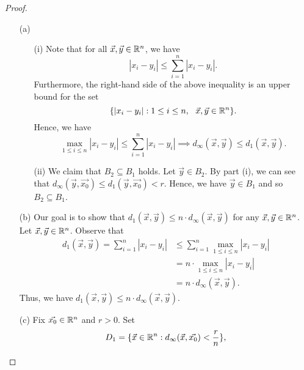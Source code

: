 \documentclass[a4paper]{article}
\begin{document}
\begin{proof}
\begin{enumerate}
    \item[(a)] 
        \begin{enumerate}
            \item[(i)] Note that for all \( \vec{ x } , \vec{ y } \in \mathbb{R}^{n} \), we have 
        \[  | {x}_{i} - {y}_{i} |  \leq \sum_{ i=1  }^{ n } | {x}_{i} - {y}_{i} |. \tag{\( \forall 1 \leq i \leq n \)}  \]
        Furthermore, the right-hand side of the above inequality is an upper bound for the set 
        \[  \{ | {x}_{i} - {y}_{i}  |  : 1 \leq i \leq n , \ \ \vec{ x } , \vec{ y  }  \in \mathbb{R}^{n} \}. \]
        Hence, we have 
        \[  \max_{1 \leq i \leq n} | {x}_{i} - {y}_{i} |  \leq \sum_{ i=1  }^{ n } | {x}_{i} - {y}_{i} | \implies {d}_{\infty }(\vec{ x } , \vec{ y } ) \leq {d}_{1}(\vec{ x } , \vec{ y } ). \]
        \item[(ii)] We claim that \( {B}_{2} \subseteq  {B}_{1} \) holds. Let \( \vec{ y }  \in {B}_{2} \). By part (i), we can see that \( {d}_{\infty }(\vec{ y } , \vec{ {x}_{0} } ) \leq {d}_{1}(\vec{ y } , \vec{ {x}_{0} } ) < r  \). Hence, we have \( \vec{ y }  \in {B}_{1} \) and so \( {B}_{2} \subseteq {B}_{1} \).
        \end{enumerate}
    \item[(b)] Our goal is to show that \( {d}_{1} (\vec{ x } ,\vec{ y } ) \leq n \cdot {d}_{\infty }(\vec{ x } , \vec{ y } ) \) for any \( \vec{ x } , \vec{ y }  \in \mathbb{R}^{n} \). Let \( \vec{ x } , \vec{ y }  \in \mathbb{R}^{n} \). Observe that 
        \begin{align*}
            {d}_{1}(\vec{ x } , \vec{ y } ) = \sum_{ i=1  }^{ n } | {x}_{i} - {y}_{i} | &\leq \sum_{ i=1  }^{ n } \max_{1 \leq i \leq n} | {x}_{i} - {y}_{i} |   \\
                                                                                        &= n \cdot \max_{1 \leq i \leq n} | {x}_{i} - {y}_{i} | \\ 
                                                                                        &= n \cdot {d}_{\infty }(\vec{ x } , \vec{ y }).
        \end{align*}
        Thus, we have \( {d}_{1}(\vec{ x } ,\vec{ y } ) \leq n \cdot {d}_{\infty }(\vec{ x } , \vec{ y } ) \).
    \item[(c)] Fix \( \vec{ {x}_{0} }  \in \mathbb{R}^{n} \) and \( r > 0  \). Set
        \begin{align*}
            {D}_{1} &= \{ \vec{ x } \in \R^{n} : {d}_{\infty }(\vec{ x } , \vec{ {x}_{0} } ) < \frac{ r }{ n }  \},  \\

\end{align*}
\end{enumerate}
\end{proof}
\end{document}
